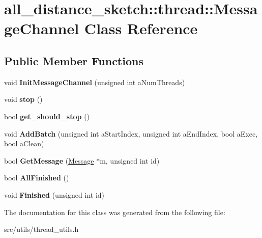 \hypertarget{classall__distance__sketch_1_1thread_1_1MessageChannel}{}\section{all\+\_\+distance\+\_\+sketch\+:\+:thread\+:\+:Message\+Channel Class Reference}
\label{classall__distance__sketch_1_1thread_1_1MessageChannel}
\subsection*{Public Member Functions}
\begin{DoxyCompactItemize}
\item 
\hypertarget{classall__distance__sketch_1_1thread_1_1MessageChannel_ae8fa25ce48f08a2b9b76745ee087d404}{}void {\bfseries Init\+Message\+Channel} (unsigned int a\+Num\+Threads)\label{classall__distance__sketch_1_1thread_1_1MessageChannel_ae8fa25ce48f08a2b9b76745ee087d404}

\item 
\hypertarget{classall__distance__sketch_1_1thread_1_1MessageChannel_af8aa8fbaf7acc8c7ebfc8e0e4e1e10eb}{}void {\bfseries stop} ()\label{classall__distance__sketch_1_1thread_1_1MessageChannel_af8aa8fbaf7acc8c7ebfc8e0e4e1e10eb}

\item 
\hypertarget{classall__distance__sketch_1_1thread_1_1MessageChannel_affaad6c19327f953bf9fa567523b5a90}{}bool {\bfseries get\+\_\+should\+\_\+stop} ()\label{classall__distance__sketch_1_1thread_1_1MessageChannel_affaad6c19327f953bf9fa567523b5a90}

\item 
\hypertarget{classall__distance__sketch_1_1thread_1_1MessageChannel_af348adf830eadc0f44aea53d84a07f39}{}void {\bfseries Add\+Batch} (unsigned int a\+Start\+Index, unsigned int a\+End\+Index, bool a\+Exec, bool a\+Clean)\label{classall__distance__sketch_1_1thread_1_1MessageChannel_af348adf830eadc0f44aea53d84a07f39}

\item 
\hypertarget{classall__distance__sketch_1_1thread_1_1MessageChannel_a382a9643dfdc31695e95f13d845207be}{}bool {\bfseries Get\+Message} (\hyperlink{structall__distance__sketch_1_1thread_1_1Message}{Message} $\ast$m, unsigned int id)\label{classall__distance__sketch_1_1thread_1_1MessageChannel_a382a9643dfdc31695e95f13d845207be}

\item 
\hypertarget{classall__distance__sketch_1_1thread_1_1MessageChannel_a429be16082aa672df57b089a81267ccd}{}bool {\bfseries All\+Finished} ()\label{classall__distance__sketch_1_1thread_1_1MessageChannel_a429be16082aa672df57b089a81267ccd}

\item 
\hypertarget{classall__distance__sketch_1_1thread_1_1MessageChannel_a34d2d32709aa2c7ba7ff6270339e297e}{}void {\bfseries Finished} (unsigned int id)\label{classall__distance__sketch_1_1thread_1_1MessageChannel_a34d2d32709aa2c7ba7ff6270339e297e}

\end{DoxyCompactItemize}


The documentation for this class was generated from the following file\+:\begin{DoxyCompactItemize}
\item 
src/utils/thread\+\_\+utils.\+h\end{DoxyCompactItemize}
